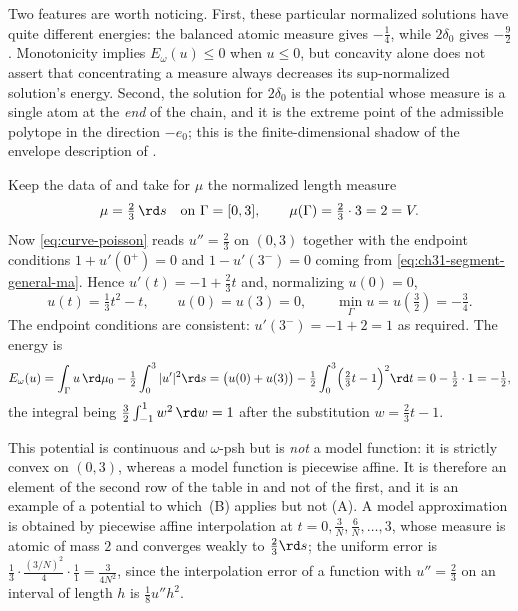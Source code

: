 \begin{example}
Two features are worth noticing.  First, these particular normalized solutions have quite different
energies: the balanced atomic measure gives $-\tfrac14$, while
$2\delta_0$ gives $-\tfrac92$.  Monotonicity implies $E_\omega(u)\leq0$
when $u\leq0$, but concavity alone does not assert that concentrating a
measure always decreases its sup-normalized solution's energy.  Second, the solution
for $2\delta_0$ is the potential whose measure is a single atom at the
\emph{end} of the chain, and it is the extreme point of the admissible
polytope in the direction $-e_0$; this is the finite-dimensional shadow of
the envelope description of .
\end{example}

\begin{example}
\label{ex:ch31-chain-lebesgue}
Keep the data of  and take for $\mu$ the
normalized length measure
\[
 \mu=\tfrac23\,\rd s\quad\text{on }\Gamma=[0,3],
 \qquad \mu(\Gamma)=\tfrac23\cdot3=2=V .
\]
Now \eqref{eq:curve-poisson} reads $u''=\tfrac23$ on $(0,3)$ together
with the endpoint conditions $1+u'(0^+)=0$ and $1-u'(3^-)=0$ coming from
\eqref{eq:ch31-segment-general-ma}.  Hence $u'(t)=-1+\tfrac23t$ and,
normalizing $u(0)=0$,
\begin{equation}
\label{eq:ch31-chain-lebesgue-potential}
 u(t)=\tfrac13t^2-t,
 \qquad u(0)=u(3)=0,
 \qquad \min_\Gamma u=u(\tfrac32)=-\tfrac34 .
\end{equation}
The endpoint conditions are consistent: $u'(3^-)=-1+2=1$ as required.  The
energy is
\[
 E_\omega(u)=\int_\Gamma u\,\rd\mu_0-\tfrac12\int_0^3|u'|^2\rd s
 =\bigl(u(0)+u(3)\bigr)-\tfrac12\int_0^3\Bigl(\tfrac23t-1\Bigr)^2\rd t
 =0-\tfrac12\cdot1=-\tfrac12 ,
\]
the integral being $\tfrac32\int_{-1}^{1}w^2\,\rd w=1$ after the
substitution $w=\tfrac23t-1$.

This potential is continuous and $\omega$-psh but is \emph{not} a model
function: it is strictly convex on $(0,3)$, whereas a model function is
piecewise affine.  It is therefore an element of the second row of the table
in  and not of the first, and it is an
example of a potential to which
\,(B) applies but not (A).  A model
approximation is obtained by piecewise affine interpolation at
$t=0,\tfrac3N,\tfrac6N,\ldots,3$, whose measure is atomic of mass $2$ and
converges weakly to $\tfrac23\rd s$; the uniform error is
$\tfrac13\cdot\tfrac{(3/N)^2}{4}\cdot\tfrac{1}{1}=\tfrac{3}{4N^2}$, since
the interpolation error of a function with $u''=\tfrac23$ on an interval
of length $h$ is $\tfrac{1}{8}u''h^2$.
\end{example}

